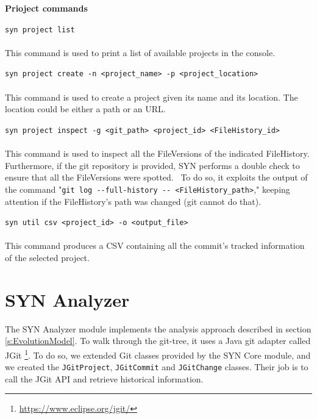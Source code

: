 \bigbreak
\textbf{Prioject commands}
\bigbreak

\lstinline{syn project list}\\
\\
This command is used to print a list of available projects in the console.

\bigbreak
\lstinline{syn project create -n <project_name> -p <project_location>}\\
\\
This command is used to create a project given its name and its location. The location could be either a path or an URL. 

\bigbreak
\lstinline{syn project inspect -g <git_path> <project_id> <FileHistory_id>}\\
\\
This command is used to inspect all the FileVersions of the indicated FileHistory. Furthermore, if the git repository is provided, SYN performs a double check to ensure that all the FileVersions were spotted. \
To do so, it exploits the output of the command "\lstinline{git log --full-history -- <FileHistory_path>}," keeping attention if the FileHistory's path was changed (git cannot do that).

\bigbreak
\lstinline{syn util csv <project_id> -o <output_file>}\\
\\
This command produces a CSV containing all the commit's tracked information of the selected project. 


\section{SYN Analyzer}
\label{sec:SYNAnalyzer}
The SYN Analyzer module implements the analysis approach described in section \ref{s:EvolutionModel}.
To walk through the git-tree, it uses a Java git adapter called JGit \footnote{\url{https://www.eclipse.org/jgit/}}. 
To do so, we extended Git classes provided by the SYN Core module, and we created the \texttt{JGitProject}, \texttt{JGitCommit} and \texttt{JGitChange} classes. Their job is to call the JGit API and retrieve historical information. 
\bigbreak

